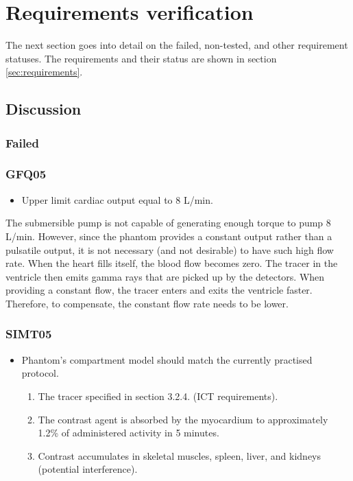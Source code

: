\chapter{Requirements verification}
\label{ch:requirements_verif}
The next section goes into detail on the failed, non-tested, and other requirement statuses. The requirements and their status are shown in section \ref{sec:requirements}.
\section{Discussion}
\subsection{Failed}
\subsection*{GFQ05}
\begin{itemize}
	\item Upper limit cardiac output equal to 8 L/min.
\end{itemize}

The submersible pump is not capable of generating enough torque to pump 8 L/min. However, since the phantom provides a constant output rather than a pulsatile output, it is not necessary (and not desirable) to have such high flow rate. When the heart fills itself, the blood flow becomes zero. The tracer in the ventricle then emits gamma rays that are picked up by the detectors. When providing a constant flow, the tracer enters and exits the ventricle faster. Therefore, to compensate, the constant flow rate needs to be lower.

\subsection*{SIMT05}
\begin{itemize}[noitemsep]
	\item Phantom’s compartment model should match the currently practised protocol.  
	\begin{enumerate}[label=\Alph*, noitemsep]
		\item The tracer specified in section 3.2.4. (ICT requirements).
		\item The contrast agent is absorbed by the myocardium to approximately 1.2\% of administered activity in 5 minutes.
		\item Contrast accumulates in skeletal muscles, spleen, liver, and kidneys (potential interference).
	\end{enumerate}
\end{itemize}

